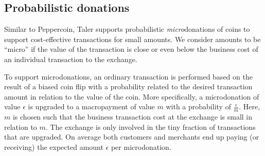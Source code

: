 \documentclass{llncs}
\begin{document}
%
%
%


\subsection{Probabilistic donations}

Similar to Peppercoin, Taler supports probabilistic {\em micro}donations of coins to
support cost-effective transactions for small amounts.  We consider
amounts to be ``micro'' if the value of the transaction is close or
even below the business cost of an individual transaction to the exchange.

To support microdonations, an ordinary transaction is performed based
on the result of a biased coin flip with a probability related to the
desired transaction amount in relation to the value of the coin.  More
specifically, a microdonation of value $\epsilon$ is upgraded to a
macropayment of value $m$ with a probability of $\frac{\epsilon}{m}$.
Here, $m$ is chosen such that the business transaction cost at the
exchange is small in relation to $m$.  The exchange is only involved in the
tiny fraction of transactions that are upgraded.  On average both
customers and merchants end up paying (or receiving) the expected
amount $\epsilon$ per microdonation.
\end{document}
